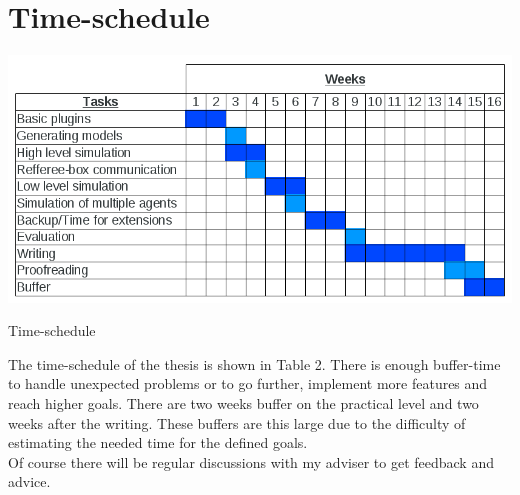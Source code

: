 \documentclass[11pt,a4paper]{article}
\begin{document}
\section{Time-schedule}

\begin{table}
\includegraphics[scale=0.43]{pics/Schedule.png}
\label{Table 2}
\caption{Time-schedule}
\end{table}

The time-schedule of the thesis is shown in Table 2. There is enough buffer-time to handle unexpected problems or to go further, implement more features and reach higher goals. There are two weeks buffer on the practical level and two weeks after the writing. These buffers are this large due to the difficulty of estimating the needed time for the defined goals.\\
Of course there will be regular discussions with my adviser to get feedback and advice.
\end{document}
